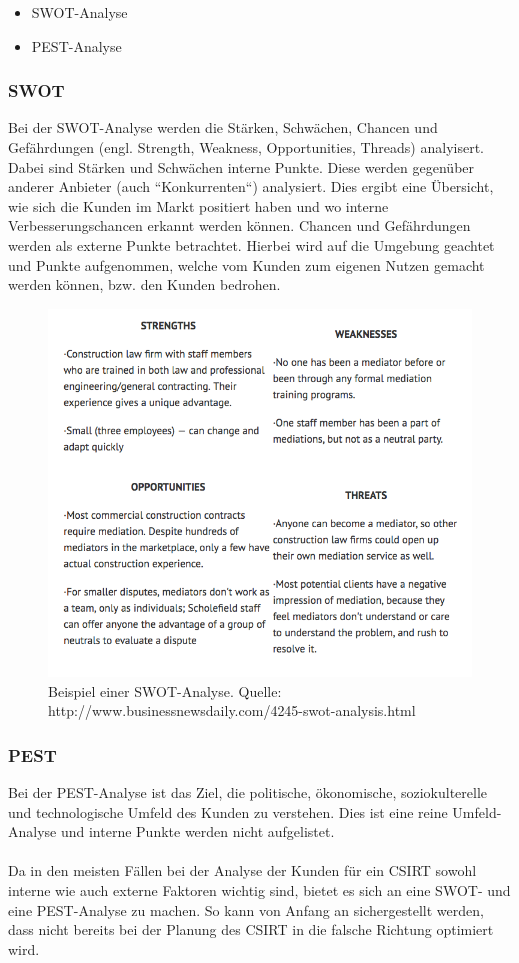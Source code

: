 \begin{itemize}
\item SWOT-Analyse
\item PEST-Analyse
\end{itemize}

\subsubsection{SWOT}
Bei der SWOT-Analyse werden die Stärken, Schwächen, Chancen und Gefährdungen (engl. Strength, Weakness, Opportunities, Threads) analyisert. Dabei sind Stärken und Schwächen interne Punkte. Diese werden gegenüber anderer Anbieter (auch ``Konkurrenten``) analysiert. Dies ergibt eine Übersicht, wie sich die Kunden im Markt positiert haben und wo interne Verbesserungschancen erkannt werden können. Chancen und Gefährdungen werden als externe Punkte betrachtet. Hierbei wird auf die Umgebung geachtet und Punkte aufgenommen, welche vom Kunden zum eigenen Nutzen gemacht werden können, bzw. den Kunden bedrohen.

\begin{figure}
  \includegraphics[width=\textwidth]{SWOTExample}
    \caption{Beispiel einer SWOT-Analyse. Quelle: http://www.businessnewsdaily.com/4245-swot-analysis.html}
    \label{fig:SWOTExample}          
\end{figure}

\subsubsection{PEST}
Bei der PEST-Analyse ist das Ziel, die politische, ökonomische, soziokulterelle und technologische Umfeld des Kunden zu verstehen. Dies ist eine reine Umfeld-Analyse und interne Punkte werden nicht aufgelistet. \\
\\
Da in den meisten Fällen bei der Analyse der Kunden für ein CSIRT sowohl interne wie auch externe Faktoren wichtig sind, bietet es sich an eine SWOT- und eine PEST-Analyse zu machen. So kann von Anfang an sichergestellt werden, dass nicht bereits bei der Planung des CSIRT in die falsche Richtung optimiert wird.

